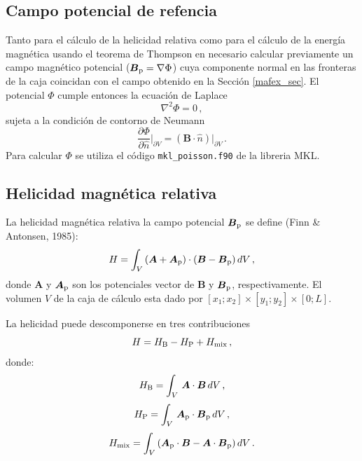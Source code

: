 \documentclass[a4paper,10pt]{article}
\def\bB{{\boldsymbol{B}}}
\def\bA{{\boldsymbol{A}}}
\def\bAp{\boldsymbol{A}_{\rm p}}
\def\bBp{\boldsymbol{B}_{\rm p}}
\def\dn#1{\frac{\partial #1}{\partial {\hat n}}}
\begin{document}
\subsection{Campo potencial de refencia}
\label{pot}

Tanto para el cálculo de la helicidad relativa como para el cálculo de la energía magnética usando el teorema de Thompson en necesario calcular previamente un campo magnético potencial ($\bBp = \nabla \Phi$) cuya componente normal en las fronteras de la caja coincidan con el campo obtenido en la Sección \ref{mafex_sec}. El potencial $\Phi$ cumple entonces la ecuación de Laplace
\begin{equation}
 \nabla^2 \Phi = 0 \,,
\end{equation}
sujeta a la condición de contorno de Neumann
\begin{equation}
\dn{\Phi} \rvert_{\partial V}  = (\bB \cdot {\hat n}) \rvert_{\partial V} \,.
\end{equation}
Para calcular $\Phi$ se utiliza el código {\tt mkl\_poisson.f90} de la libreria MKL.

\subsection{Helicidad magnética relativa}
\label{helicity_sec}

La helicidad magnética relativa la campo potencial $\bBp$ se define (Finn \& Antonsen, 1985):
\begin{equation}
 H = \int_V \, (\bA + \bAp) \cdot (\bB - \bBp) \,dV \,,
\end{equation}
donde $\bA$ y $\bAp$ son los potenciales vector de $\bB$ y $\bBp$, respectivamente. El volumen $V$ de la caja de cálculo esta dado por $[x_1; x_2] \times [y_1; y_2] \times [0; L]$.

La helicidad puede descomponerse en tres contribuciones 
\begin{equation}
 H = H_{\rm B} - H_{\rm P} + H_{\rm mix} \,, 
\end{equation}
donde:
\begin{equation}
 H_{\rm B} = \int_{V} \, \bA \cdot \bB \, dV \,,
\end{equation}
\begin{equation}
 H_{\rm P} = \int_{V} \, \bAp \cdot \bBp \,dV \,,
\end{equation}
\begin{equation}
 H_{\rm mix} = \int_{V} \, (\bAp \cdot \bB - \bA \cdot \bBp) \,dV \,.
\end{equation}
\end{document}
